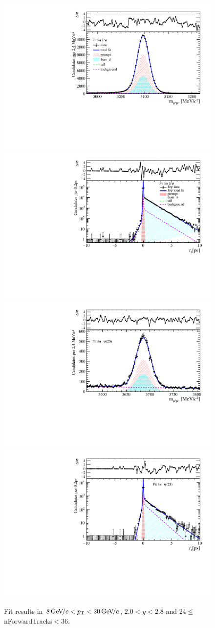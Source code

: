 \begin{figure}[H]
\begin{center}
\includegraphics[width=0.47\linewidth]{pdf/Jpsi/drawmassF/n3y1pt5.pdf}
\includegraphics[width=0.47\linewidth]{pdf/Jpsi/2DFitF/n3y1pt5.pdf}
\vspace*{-0.5cm}
\includegraphics[width=0.47\linewidth]{pdf/Psi2S/drawmassF/n3y1pt5.pdf}
\includegraphics[width=0.47\linewidth]{pdf/Psi2S/2DFitF/n3y1pt5.pdf}
\vspace*{-0.5cm}
\end{center}
\caption{Fit results in $8\text{\,Ge\kern -0.1em V\!/}c<p_{\mathrm{T}}<20\text{\,Ge\kern -0.1em V\!/}c$, $2.0<y<2.8$ and 24$\leq$nForwardTracks$<$36.}
\label{Fitn3y1pt5}
\end{figure}
